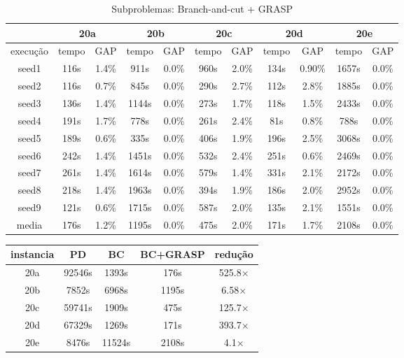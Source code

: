 \documentclass[12pt]{article}
\begin{document}
\begin{table}[!htb]
\centering
\footnotesize
\begin{tabular}{|c|c|c|c|c|c|c|c|c|c|c|}
\cline{2-11}
\multicolumn{1}{c}{} & \multicolumn{2}{|c}{20a} & \multicolumn{2}{|c}{20b} & \multicolumn{2}{|c}{20c} & \multicolumn{2}{|c}{20d} & \multicolumn{2}{|c|}{20e}  \\
\hline
execu\c{c}\~ao & tempo & GAP & tempo & GAP & tempo & GAP & tempo & GAP & tempo & GAP \\
\hline
seed1 & 116s & 1.4\% & 911s & 0.0\% & 960s & 2.0\% & 134s & 0.90\% & 1657s & 0.0\% \\
seed2 & 116s & 0.7\% & 845s & 0.0\% & 290s & 2.7\% & 112s & 2.8\% & 1885s & 0.0\% \\
seed3 & 136s & 1.4\% & 1144s & 0.0\% & 273s & 1.7\% & 118s & 1.5\% & 2433s & 0.0\% \\
seed4 & 191s & 1.7\% & 778s & 0.0\% & 261s & 2.4\% & 81s & 0.8\% & 788s & 0.0\% \\
seed5 & 189s & 0.6\% & 335s & 0.0\% & 406s & 1.9\% & 196s & 2.5\% & 3068s & 0.0\% \\
seed6 & 242s & 1.4\% & 1451s & 0.0\% & 532s & 2.4\% & 251s & 0.6\% & 2469s & 0.0\% \\
seed7 & 261s & 1.4\% & 1614s & 0.0\% & 579s & 1.4\% & 331s & 2.1\% & 2172s & 0.0\% \\
seed8 & 218s & 1.4\% & 1963s & 0.0\% & 394s & 1.9\% & 186s & 2.0\% & 2952s & 0.0\% \\
seed9 & 121s & 0.6\% & 1715s & 0.0\% & 587s & 2.0\% & 135s & 2.1\% & 1551s & 0.0\% \\
\hline
\hline
media & 176s & 1.2\% & 1195s & 0.0\% & 475s & 2.0\% & 171s & 1.7\% & 2108s & 0.0\% \\
\hline
\end{tabular}
\caption{Subproblemas: Branch-and-cut + GRASP}
\end{table}

\begin{table}[!htb]
\centering
\footnotesize
\begin{tabular}{|c|c|c|c|c|}
\hline
instancia & PD & BC & BC+GRASP & redu\c{c}\~ao \\
\hline
20a & 92546s & 1393s & 176s & 525.8$\times$ \\
20b & 7852s & 6968s & 1195s & 6.58$\times$ \\
20c & 59741s & 1909s & 475s & 125.7$\times$ \\
20d & 67329s & 1269s & 171s & 393.7$\times$ \\
20e & 8476s & 11524s & 2108s & 4.1$\times$ \\
\hline
\end{tabular}
\end{table}
		
\end{document}
